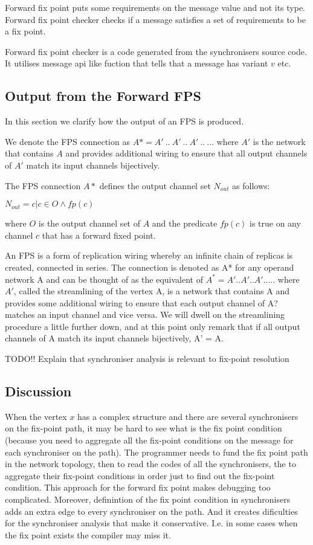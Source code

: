Forward fix point puts some requirements on the message value and not its type.
Forward fix point checker checks if a message satisfies a set of requirements to be a fix point.

Forward fix point checker is a code generated from the synchronisers source code. It utilises message api like fuction that tells that a message has variant $v$ etc.


    \subsection{Output from the Forward FPS}
In this section we clarify how the output of an FPS is produced.

We denote the FPS connection as $A* = A' \: .. \: A' \: .. \: A' \: .. \: \dots$ where $A'$ is the network that contains $A$ and provides additional wiring to ensure that all output channels of $A'$ match its input channels bijectively.

The FPS connection $A*$ defines the output channel set $N_{out}$ as follows:

$N_{out} = { c | c \in O \land fp(c) }$

where $O$ is the output channel set of $A$ and the predicate $fp(c)$ is true on any channel $c$ that has a forward fixed point.


An FPS is a form of replication wiring whereby an infinite chain of replicas is created, connected
in series. The connection is denoted as A* for any operand network A and can be thought of as the equivalent of
$A^* = A'..A'..A'.. \dots$
where $A'$, called the streamlining of the vertex A, is a network that contains A and provides some additional wiring to ensure that each output channel of A? matches an input channel and vice versa. We will dwell on the streamlining procedure a little further down, and at this point only remark that if all output channels of A match its input channels bijectively, A' = A.




TODO!! Explain that synchroniser analysis is relevant to fix-point resolution

    \subsection{Discussion}
When the vertex $x$ has a complex structure and there are several synchronisers on the fix-point path, it may be hard to see what is the fix point condition (because you need to aggregate all the fix-point conditions on the message for each synchroniser on the path). The programmer needs to fund the fix point path in the network topology, then to read the codes of all the synchronisers, the to aggregate their fix-point conditions in order just to find out the fix-point condition. This approach for the forward fix point makes debugging too complicated. Moreover, definintion of the fix point condition in synchronisers adds an extra edge to every synchroniser on the path. And it creates dificulties for the synchroniser analysis that make it conservative. I.e. in some cases when the fix point exists the compiler may miss it.

